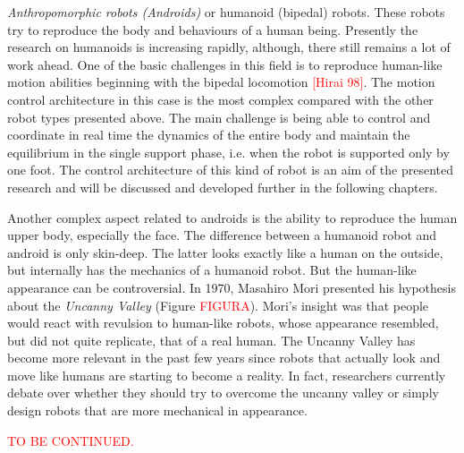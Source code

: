 \textit{Anthropomorphic robots (Androids)} or humanoid (bipedal) robots. These robots try to reproduce the body and behaviours of a human being. Presently the research on humanoids is increasing rapidly, although, there still remains a lot of work ahead. One of the basic challenges in this field is to reproduce human-like motion abilities beginning with the bipedal locomotion \textcolor{red}{[Hirai 98]}. The motion control architecture in this case is the most complex compared with the other robot types presented above. The main challenge is being able to control and coordinate in real time the dynamics of the entire body and maintain the equilibrium in the single support phase, i.e. when the robot is supported only by one foot. The control architecture of this kind of robot is an aim of the presented research and will be discussed and developed further in the following chapters.

Another complex aspect related to androids is the ability to reproduce the human upper body, especially the face. The difference between a humanoid robot and android is only skin-deep. The latter looks exactly like a human on the outside, but internally has the mechanics of a humanoid robot. But the human-like appearance can be controversial. In 1970, Masahiro Mori presented his hypothesis about the \textit{Uncanny Valley} (Figure \textcolor{red}{FIGURA}). Mori's insight was that people would react with revulsion to human-like robots, whose appearance resembled, but did not quite replicate, that of a real human. The Uncanny Valley has become more relevant in the past few years since robots that actually look and move like humans are starting to become a reality. In fact, researchers currently debate over whether they should try to overcome the uncanny valley or simply design robots that are more mechanical in appearance.

\textcolor{red}{TO BE CONTINUED.}